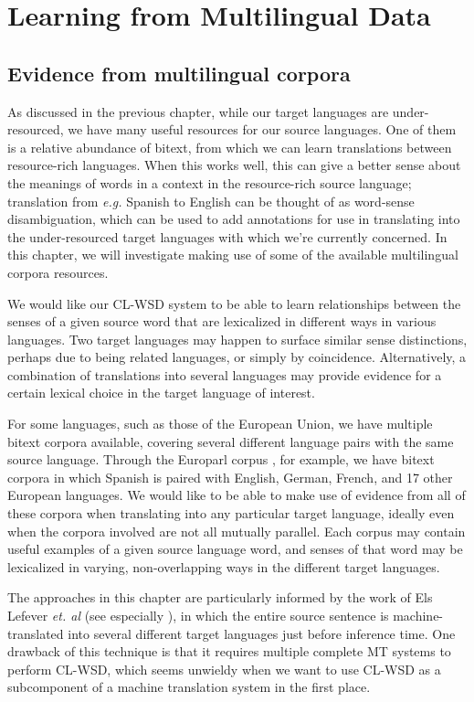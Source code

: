 \chapter{Learning from Multilingual Data}
\label{chap:multilingual}

\section{Evidence from multilingual corpora}
As discussed in the previous chapter, while our target languages are
under-resourced, we have many useful resources for our source languages. One of
them is a relative abundance of bitext, from which we can learn translations
between resource-rich languages. When this works well, this can give a better
sense about the meanings of words in a context in the resource-rich source
language; translation from \emph{e.g.} Spanish to English can be thought of as
word-sense disambiguation, which can be used to add annotations for use in
translating into the under-resourced target languages with which we're
currently concerned. In this chapter, we will investigate making use of some of
the available multilingual corpora resources.

We would like our CL-WSD system to be able to learn relationships between the
senses of a given source word that are lexicalized in different ways in various
languages.
Two target languages may happen to surface similar sense distinctions, perhaps
due to being related languages, or simply by coincidence. Alternatively, a
combination of translations into several languages may provide evidence for a
certain lexical choice in the target language of interest.

For some languages, such as those of the European Union, we have multiple
bitext corpora available, covering several different language pairs with the
same source language. Through the Europarl corpus \cite{europarl}, for example,
we have bitext corpora in which Spanish is paired with English, German, French,
and 17 other European languages.
We would like to be able to make use of evidence from all of these corpora when
translating into any particular target language, ideally even when the corpora
involved are not all mutually parallel.
Each corpus may contain useful examples of a given source language word,
and senses of that word may be lexicalized in varying, non-overlapping ways in
the different target languages.

The approaches in this chapter are particularly informed by the work of Els
Lefever \emph{et. al} (see especially
\cite{lefever-hoste-decock:2011:ACL-HLT2011}), in which the entire source
sentence is machine-translated into several different target languages just
before inference time. One drawback of this technique is that it requires
multiple complete MT systems to perform CL-WSD, which seems unwieldy when we
want to use CL-WSD as a subcomponent of a machine translation system in the
first place.


